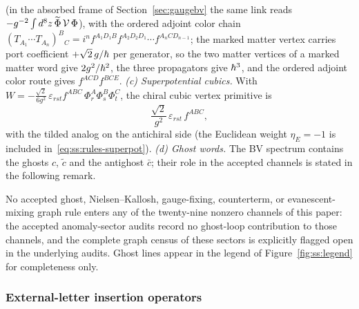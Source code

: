 (in the absorbed frame of Section~\ref{sec:gaugebv} the same link reads $-g^{-2}\int d^{8}z\,\widetilde\Phi\,\mathcal{V}\,\Phi$),
with the ordered adjoint color chain $(T_{A_{1}}\cdots T_{A_{n}})^{B}{}_{C}=i^{n}f^{A_{1}D_{1}B}f^{A_{2}D_{2}D_{1}}\cdots f^{A_{n}CD_{n-1}}$; the marked matter vertex carries port coefficient $+\sqrt2\,g/\hbar$ per generator, so the two matter vertices of a marked matter word give $2g^{2}/\hbar^{2}$, the three propagators give $\hbar^{3}$, and the ordered adjoint color route gives $f^{ACD}f^{BCE}$.
\emph{(c) Superpotential cubics.} With $W=-\frac{\sqrt2}{6g^{2}}\,\varepsilon_{rst}f^{ABC}\,\Phi_{r}^{A}\Phi_{s}^{B}\Phi_{t}^{C}$, the chiral cubic vertex primitive is
\begin{equation}\label{eq:ss:rules-superpot}
\frac{\sqrt2}{g^{2}}\,\varepsilon_{rst}\,f^{ABC} ,
\end{equation}
with the tilded analog on the antichiral side (the Euclidean weight $\eta_{E}=-1$ is included in~\eqref{eq:ss:rules-superpot}).
\emph{(d) Ghost words.} The BV spectrum contains the ghosts $c$, $\widetilde c$ and the antighost $\bar c$; their role in the accepted channels is stated in the following remark.

\begin{remark}%
\label{rem:ss:rules-ghost}
No accepted ghost, Nielsen--Kallosh, gauge-fixing, counterterm, or evanescent-mixing graph rule enters any of the twenty-nine nonzero channels of this paper: the accepted anomaly-sector audits record no ghost-loop contribution to those channels, and the complete graph census of these sectors is explicitly flagged open in the underlying audits. Ghost lines appear in the legend of Figure~\ref{fig:ss:legend} for completeness only.
\end{remark}

\subsubsection*{External-letter insertion operators}

